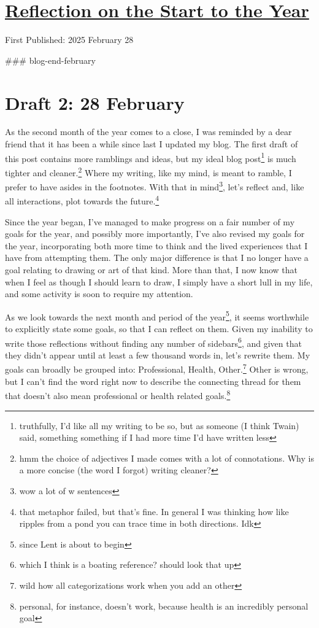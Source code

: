 \documentclass[12pt]{article}[titlepage]
\renewcommand{\,}{\textsuperscript{,}}
\begin{document}
\doublespacing
\section{\href{reflection-february-2025.tex}{Reflection on the Start to the Year}}
First Published: 2025 February 28


### blog-end-february

\section{Draft 2: 28 February}  
As the second month of the year comes to a close, I was reminded by a dear friend that it has been a while since last I updated my blog.  
The first draft of this post contains more ramblings and ideas, but my ideal blog post\footnote{truthfully, I'd like all my writing to be so, but as someone (I think Twain) said, something something if I had more time I'd have written less} is much tighter and cleaner.\footnote{hmm the choice of adjectives I made comes with a lot of connotations. Why is a more concise (the word I forgot) writing cleaner?}  
Where my writing, like my mind, is meant to ramble, I prefer to have asides in the footnotes.  
With that in mind\footnote{wow a lot of w sentences}, let's reflect and, like all interactions, plot towards the future.\footnote{that metaphor failed, but that's fine. In general I was thinking how like ripples from a pond you can trace time in both directions. Idk}

Since the year began, I've managed to make progress on a fair number of my goals for the year, and possibly more importantly, I've also revised my goals for the year, incorporating both more time to think and the lived experiences that I have from attempting them.  
The only major difference is that I no longer have a goal relating to drawing or art of that kind.  
More than that, I now know that when I feel as though I should learn to draw, I simply have a short lull in my life, and some activity is soon to require my attention.

As we look towards the next month and period of the year\footnote{since Lent is about to begin}, it seems worthwhile to explicitly state some goals, so that I can reflect on them.  
Given my inability to write those reflections without finding any number of sidebars\footnote{which I think is a boating reference? should look that up}, and given that they didn't appear until at least a few thousand words in, let's rewrite them.  
My goals can broadly be grouped into: Professional, Health, Other.\footnote{wild how all categorizations work when you add an other}  
Other is wrong, but I can't find the word right now to describe the connecting thread for them that doesn't also mean professional or health related goals.\footnote{personal, for instance, doesn't work, because health is an incredibly personal goal}
\end{document}
